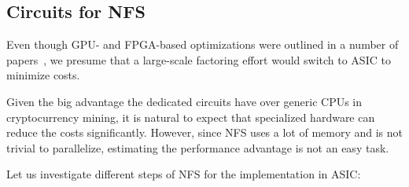 \documentclass[a4paper]{article}
\begin{document}
 \subsection{Circuits for NFS}
 
 
 Even though GPU- and FPGA-based optimizations were outlined in a number of papers~\cite{Archer10,DBLP:conf/ches/MieleBKL14}, we presume that a large-scale factoring effort would switch to ASIC to minimize costs.
 
 
 Given the big advantage the dedicated circuits have over generic CPUs in cryptocurrency mining, it is natural to expect that specialized hardware can reduce the costs significantly. However, since NFS uses a lot of memory and is not trivial to parallelize, estimating the performance advantage is not an easy task.
 
 Let us investigate different steps of NFS for the implementation in ASIC:
\end{document}
